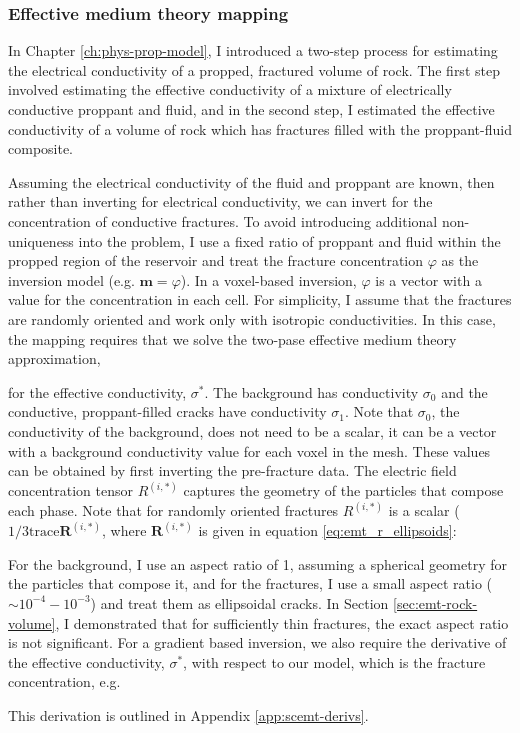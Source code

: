 \subsubsection{Effective medium theory mapping}
\label{sec:emt_mapping}

In Chapter \ref{ch:phys-prop-model}, I introduced a two-step process for estimating the electrical conductivity of a propped, fractured volume of rock. The first step involved estimating the effective conductivity of a mixture of electrically conductive proppant and fluid, and in the second step, I estimated the effective conductivity of a volume of rock which has fractures filled with the proppant-fluid composite.

Assuming the electrical conductivity of the fluid and proppant are known, then rather than inverting for electrical conductivity, we can invert for the concentration of conductive fractures. To avoid introducing additional non-uniqueness into the problem, I use a fixed ratio of proppant and fluid within the propped region of the reservoir and treat the fracture concentration $\varphi$ as the inversion model (e.g. $\mathbf{m} = \varphi$). In a voxel-based inversion, $\varphi$ is a vector with a value for the concentration in each cell. For simplicity, I assume that the fractures are randomly oriented and work only with isotropic conductivities. In this case, the mapping requires that we solve the two-pase effective medium theory approximation,

for the effective conductivity, $\sigma^*$. The background has conductivity $\sigma_0$ and the conductive, proppant-filled cracks have conductivity $\sigma_1$. Note that $\sigma_0$, the conductivity of the background, does not need to be a scalar, it can be a vector with a background conductivity value for each voxel in the mesh. These values can be obtained by first inverting the pre-fracture data. The electric field concentration tensor $R^{(i,*)}$ captures the geometry of the particles that compose each phase. Note that for randomly oriented fractures $R^{(i,*)}$ is a scalar ($1/3 \text{trace}{\mathbf{R}^{(i,*)}}$, where $\mathbf{R}^{(i,*)}$ is given in equation \ref{eq:emt_r_ellipsoids}:

For the background, I use an aspect ratio of 1, assuming a spherical geometry for the particles that compose it, and for the fractures, I use a small aspect ratio ($\sim 10^{-4} - 10^{-3}$) and treat them as ellipsoidal cracks. In Section \ref{sec:emt-rock-volume}, I demonstrated that for sufficiently thin fractures, the exact aspect ratio is not significant. For a gradient based inversion, we also require the derivative of the effective conductivity, $\sigma^*$, with respect to our model, which is the fracture concentration, e.g.

 This derivation is outlined in Appendix \ref{app:scemt-derivs}.

